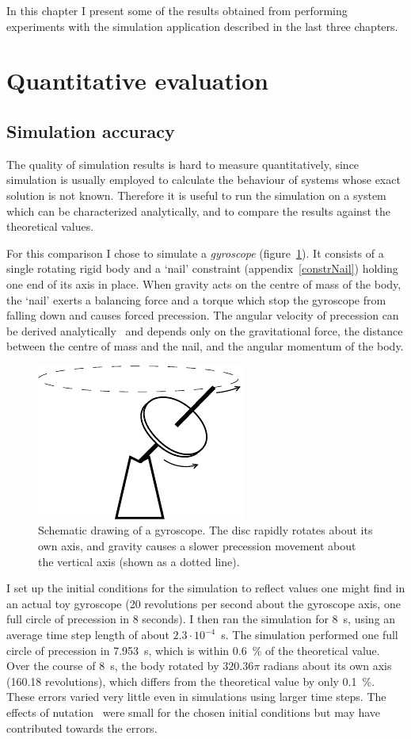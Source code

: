 In this chapter I present some of the results obtained from performing experiments with the
simulation application described in the last three chapters.

\section{Quantitative evaluation}
\subsection{Simulation accuracy}
The quality of simulation results is hard to measure quantitatively, since simulation is usually
employed to calculate the behaviour of systems whose exact solution is not known. Therefore it is
useful to run the simulation on a system which can be characterized analytically, and to compare
the results against the theoretical values.

For this comparison I chose to simulate a \emph{gyroscope} (figure~\ref{gyroscope}). It consists
of a single rotating rigid body and a `nail' constraint (appendix~\ref{constrNail}) holding one
end of its axis in place. When gravity acts on the centre of mass of the body, the `nail' exerts
a balancing force and a torque which stop the gyroscope from falling down and causes forced
precession. The angular velocity of precession can be derived analytically~\cite{Julian:notes}
and depends only on the gravitational force, the distance between the centre of mass and the
nail, and the angular momentum of the body.

\begin{figure}
\centerline{\includegraphics{figures/gyroscope}}
\caption{Schematic drawing of a gyroscope. The disc rapidly rotates about its own axis, and
    gravity causes a slower precession movement about the vertical axis (shown as a dotted line).
    \label{gyroscope}}
\end{figure}

I set up the initial conditions for the simulation to reflect values one might find in an actual
toy gyroscope (20 revolutions per second about the gyroscope axis, one full circle of precession
in 8 seconds). I then ran the simulation for 8~s, using an average time step length of about
$2.3\cdot 10^{-4}$~s. The simulation performed one full circle of precession in 7.953~s, which
is within 0.6~\% of the theoretical value. Over the course of 8~s, the body rotated by $320.36\pi$
radians about its own axis (160.18 revolutions), which differs from the theoretical value by only
0.1~\%. These errors varied very little even in simulations using larger time steps.
The effects of nutation~\cite{Feynman:63} were small for the chosen initial conditions but may
have contributed towards the errors.

